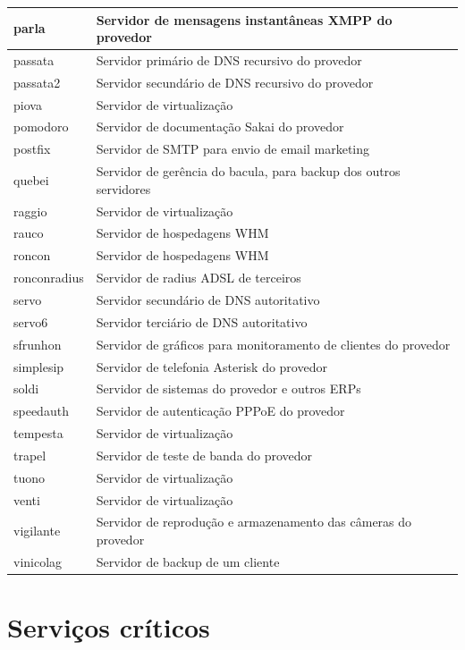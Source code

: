 \begin{table}
\begin{center}
\begin{tabular}{|l|p{12cm}|}
parla & Servidor de mensagens instantâneas XMPP do provedor\\\hline
passata & Servidor primário de DNS recursivo do provedor\\\hline
passata2 & Servidor secundário de DNS recursivo do provedor\\\hline
piova & Servidor de virtualização\\\hline
pomodoro & Servidor de documentação Sakai do provedor\\\hline
postfix & Servidor de SMTP para envio de email marketing\\\hline
quebei & Servidor de gerência do bacula, para backup dos outros servidores\\\hline
raggio & Servidor de virtualização\\\hline
rauco & Servidor de hospedagens WHM\\\hline
roncon & Servidor de hospedagens WHM\\\hline
ronconradius & Servidor de radius ADSL de terceiros\\\hline
servo & Servidor secundário de DNS autoritativo\\\hline
servo6 & Servidor terciário de DNS autoritativo\\\hline
sfrunhon & Servidor de gráficos para monitoramento de clientes do provedor\\\hline
simplesip & Servidor de telefonia Asterisk do provedor\\\hline
soldi & Servidor de sistemas do provedor e outros ERPs\\\hline
speedauth & Servidor de autenticação PPPoE do provedor\\\hline
tempesta & Servidor de virtualização\\\hline
trapel & Servidor de teste de banda do provedor\\\hline
tuono & Servidor de virtualização\\\hline
venti & Servidor de virtualização\\\hline
vigilante & Servidor de reprodução e armazenamento das câmeras do provedor\\\hline
vinicolag & Servidor de backup de um cliente\\\hline
\end{tabular}
\end{center}
\end{table}


\section{Serviços críticos}
\label{section:servcrit}

